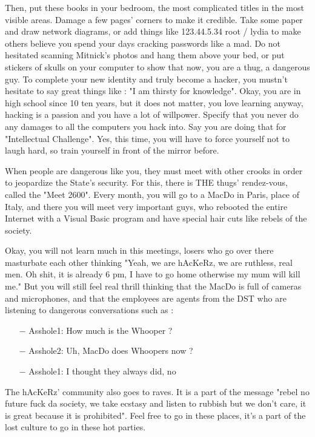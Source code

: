 Then, put these books in your bedroom, the most complicated titles in the most visible areas. Damage a few pages' corners to make it credible. Take some paper and draw network diagrams, or add things like 123.44.5.34 root / lydia to make others believe you spend your days cracking passwords like a mad. Do not hesitated scanning Mitnick's photos and hang them above your bed, or put stickers of skulls on your computer to show that now, you are a thug, a dangerous guy.
To complete your new identity and truly become a hacker, you mustn't hesitate to say great things like : "I am thirsty for knowledge". Okay, you are in high school since 10 ten years, but it does not matter, you love learning anyway, hacking is a passion and you have a lot of willpower. Specify that you never do any damages to all the computers you hack into. Say you are doing that for "Intellectual Challenge". Yes, this time, you will have to force yourself not to laugh hard, so train yourself in front of the mirror before.

When people are dangerous like you, they must meet with other crooks in order to jeopardize the State's security. For this, there is THE thugs' rendez-vous, called the "Meet 2600". Every month, you will go to a MacDo in Paris, place of Italy, and there you will meet very important guys, who rebooted the entire Internet with a Visual Basic program and have special hair cuts like rebels of the society.

Okay, you will not learn much in this meetings, losers who go over there masturbate each other thinking "Yeah, we are hAcKeRz, we are ruthless, real men. Oh shit, it is already 6 pm, I have to go home otherwise my mum will kill me." But you will still feel real thrill thinking that the MacDo is full of cameras and microphones, and that the employees are agents from the DST who are listening to dangerous conversations such as :

\begin{itemize}
	\item[$-$] Asshole1: How much is the Whooper ?
	\item[$-$] Asshole2: Uh, MacDo does Whoopers now ?
	\item[$-$] Asshole1: I thought they always did, no 
\end{itemize}

The hAcKeRz' community also goes to raves. It is a part of the message "rebel no future fuck da society, we take ecstasy and listen to rubbish but we don't care, it is great because it is prohibited". Feel free to go in these places, it's a part of the lost culture to go in these hot parties.

